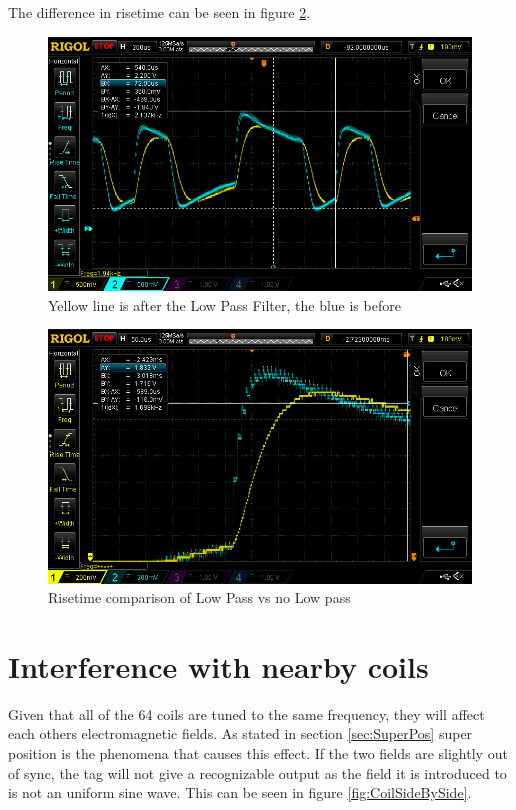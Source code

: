 The difference in risetime can be seen in figure \ref{fig:06:low_pass_rise}.

\begin{figure}[H]
    \centering
    \includegraphics[width=\textwidth]{06_My_Testing_Results/figures/Low_pass_vs_no_low_pass/4_periods.png}
    \caption{Yellow line is after the Low Pass Filter, the blue is before}
    \label{fig:06:low_pass_full}
\end{figure}

\begin{figure}[H]
    \centering
    \includegraphics[width=\textwidth]{06_My_Testing_Results/figures/Low_pass_vs_no_low_pass/1_PERIOD.png}
    \caption{Risetime comparison of Low Pass vs no Low pass}
    \label{fig:06:low_pass_rise}
\end{figure}
\section{Interference with nearby coils}
Given that all of the 64 coils are tuned to the same frequency, they will affect each others electromagnetic fields. As stated in section \ref{sec:SuperPos} super position is the phenomena that causes this effect. If the two fields are slightly out of sync, the tag will not give a recognizable output as the field it is introduced to is not an uniform sine wave. This can be seen in figure \ref{fig:CoilSideBySide}. 

